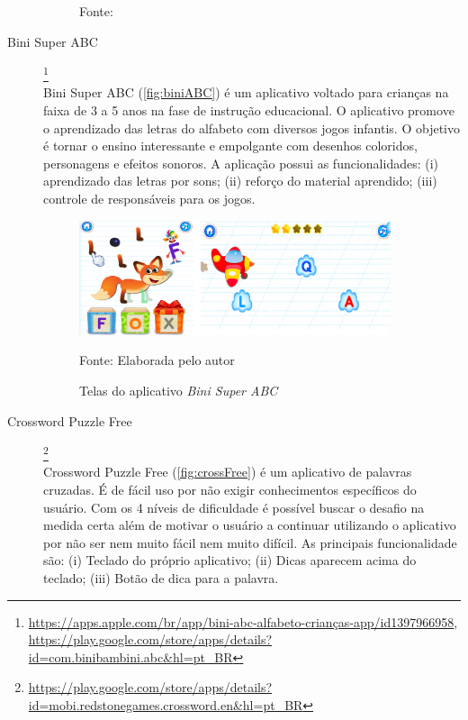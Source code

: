 \begin{description}
\begin{figure}[ht!]
    Fonte: \cite{HumanAnatomyAtlas}
\end{figure}

\item[Bini Super ABC]\footnote{\url{https://apps.apple.com/br/app/bini-abc-alfabeto-crianças-app/id1397966958}, \url{https://play.google.com/store/apps/details?id=com.binibambini.abc&hl=pt_BR}} \hfill \\
Bini Super ABC (\autoref{fig:biniABC}) é um aplicativo voltado para crianças na faixa de 3 a 5 anos na fase de instrução educacional. O aplicativo promove o aprendizado das letras do alfabeto com diversos jogos infantis. O objetivo é tornar o ensino interessante e empolgante com desenhos coloridos, personagens e efeitos sonoros. A aplicação possui as funcionalidades: (i) aprendizado das letras por sons; (ii) reforço do material aprendido; (iii) controle de responsáveis para os jogos.

\begin{figure}[H]
\centering
    \caption{Telas do aplicativo \textit{Bini Super ABC}}
    \label{fig:biniABC}
    \includegraphics[width=0.9\textwidth]{Figuras/biniabc.png}
    
    Fonte: Elaborada pelo autor
\end{figure}

\item[Crossword Puzzle Free]\footnote{\url{https://play.google.com/store/apps/details?id=mobi.redstonegames.crossword.en&hl=pt_BR}} \hfill \\
Crossword Puzzle Free (\autoref{fig:crossFree}) é um aplicativo de palavras cruzadas. É de fácil  uso por não exigir conhecimentos específicos do usuário. Com os 4 níveis de dificuldade é possível buscar o desafio na medida certa além de motivar o usuário a continuar utilizando o aplicativo por não ser nem muito fácil nem muito difícil. As principais funcionalidade são: (i) Teclado do próprio aplicativo; (ii) Dicas aparecem acima do teclado; (iii) Botão de dica para a palavra.



\end{description}
